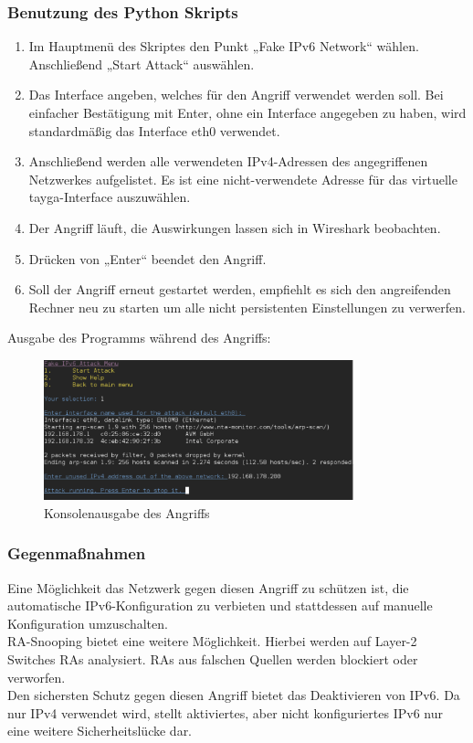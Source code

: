 \subsubsection*{Benutzung des Python Skripts}
\begin{enumerate}
	\item Im Hauptmenü des Skriptes den Punkt „Fake IPv6 Network“ wählen. Anschließend „Start Attack“ auswählen.
	\item Das Interface angeben, welches für den Angriff verwendet werden soll. Bei einfacher Bestätigung mit Enter, ohne ein Interface angegeben zu haben, wird standardmäßig das Interface eth0 verwendet.
	\item Anschließend werden alle verwendeten IPv4-Adressen des angegriffenen Netzwerkes aufgelistet. Es ist eine nicht-verwendete Adresse für das virtuelle tayga-Interface auszuwählen.
	\item Der Angriff läuft, die Auswirkungen lassen sich in Wireshark beobachten.
	\item Drücken von „Enter“ beendet den Angriff.
	\item Soll der Angriff erneut gestartet werden, empfiehlt es sich den angreifenden Rechner neu zu starten um alle nicht persistenten Einstellungen zu verwerfen.
\end{enumerate}
Ausgabe des Programms während des Angriffs:
\begin{figure}[h!]
	\centering
	\includegraphics[width=0.80\textwidth]{bilder/fakeIPv6/fakeIPv6menu.pdf}
	\caption{Konsolenausgabe des Angriffs}
	\label{fig:fakeIPv6menu}
\end{figure}


\subsubsection*{Gegenmaßnahmen}
Eine Möglichkeit das Netzwerk gegen diesen Angriff zu schützen ist, die automatische IPv6-Konfiguration zu verbieten und stattdessen auf manuelle Konfiguration umzuschalten. \\
RA-Snooping bietet eine weitere Möglichkeit. Hierbei werden auf Layer-2 Switches RAs analysiert. RAs aus falschen Quellen werden blockiert oder verworfen. \\
Den sichersten Schutz gegen diesen Angriff bietet das Deaktivieren von IPv6. Da nur IPv4 verwendet wird, stellt aktiviertes, aber nicht konfiguriertes IPv6 nur eine weitere Sicherheitslücke dar.
